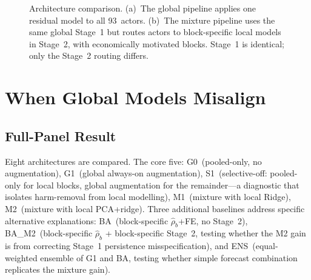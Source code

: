 \documentclass[11pt,a4paper]{article}
\begin{document}
\begin{figure}[ht]
\caption{Architecture comparison. (a)~The global pipeline applies one residual model to all 93~actors. (b)~The mixture pipeline uses the same global Stage~1 but routes actors to block-specific local models in Stage~2, with economically motivated blocks. Stage~1 is identical; only the Stage~2 routing differs.}
\label{fig:pipeline}
\end{figure}


\section{When Global Models Misalign}
\label{sec:results}

\subsection{Full-Panel Result}

Eight architectures are compared. The core five: G0~(pooled-only, no augmentation), G1~(global always-on augmentation), S1~(selective-off: pooled-only for local blocks, global augmentation for the remainder---a diagnostic that isolates harm-removal from local modelling), M1~(mixture with local Ridge), M2~(mixture with local PCA+ridge). Three additional baselines address specific alternative explanations: BA~(block-specific $\hat\rho_b$+FE, no Stage~2), BA\_M2~(block-specific $\hat\rho_b$ + block-specific Stage~2, testing whether the M2 gain is from correcting Stage~1 persistence misspecification), and ENS~(equal-weighted ensemble of G1 and BA, testing whether simple forecast combination replicates the mixture gain).
\end{document}
